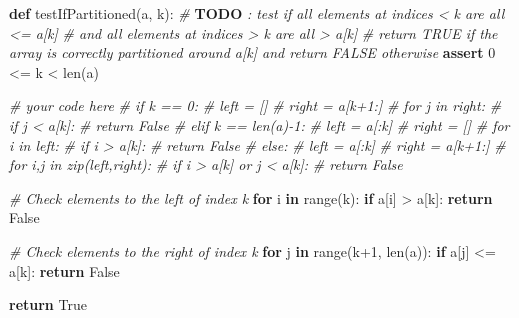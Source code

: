 \documentclass[
]{article}
\newenvironment{Shaded}{}{}
\newcommand{\AlertTok}[1]{\textcolor[rgb]{1.00,0.00,0.00}{\textbf{#1}}}
\newcommand{\BuiltInTok}[1]{\textcolor[rgb]{0.00,0.50,0.00}{#1}}
\newcommand{\CommentTok}[1]{\textcolor[rgb]{0.38,0.63,0.69}{\textit{#1}}}
\newcommand{\ControlFlowTok}[1]{\textcolor[rgb]{0.00,0.44,0.13}{\textbf{#1}}}
\newcommand{\DecValTok}[1]{\textcolor[rgb]{0.25,0.63,0.44}{#1}}
\newcommand{\KeywordTok}[1]{\textcolor[rgb]{0.00,0.44,0.13}{\textbf{#1}}}
\newcommand{\NormalTok}[1]{#1}
\newcommand{\OperatorTok}[1]{\textcolor[rgb]{0.40,0.40,0.40}{#1}}
\newcommand{\VariableTok}[1]{\textcolor[rgb]{0.10,0.09,0.49}{#1}}
\begin{document}
\begin{Shaded}
\begin{Highlighting}[]
\KeywordTok{def}\NormalTok{ testIfPartitioned(a, k):}
    \CommentTok{\# }\AlertTok{TODO}\CommentTok{ : test if all elements at indices \textless{} k are all \textless{}= a[k]}
    \CommentTok{\#         and all elements at indices \textgreater{} k are all \textgreater{} a[k]}
    \CommentTok{\# return TRUE if the array is correctly partitioned around a[k] and return FALSE otherwise}
    \ControlFlowTok{assert} \DecValTok{0} \OperatorTok{\textless{}=}\NormalTok{ k }\OperatorTok{\textless{}} \BuiltInTok{len}\NormalTok{(a)}

    \CommentTok{\# your code here}
    \CommentTok{\# if k == 0:}
    \CommentTok{\#   left = []}
    \CommentTok{\#   right = a[k+1:]}
    \CommentTok{\#   for j in right:}
    \CommentTok{\#     if j \textless{} a[k]:}
    \CommentTok{\#       return False}
    \CommentTok{\# elif k == len(a){-}1:}
    \CommentTok{\#   left = a[:k]}
    \CommentTok{\#   right = []}
    \CommentTok{\#   for i in left:}
    \CommentTok{\#     if i \textgreater{} a[k]:}
    \CommentTok{\#       return False}
    \CommentTok{\# else:}
    \CommentTok{\#   left = a[:k]}
    \CommentTok{\#   right = a[k+1:]}
    \CommentTok{\#   for i,j in zip(left,right):}
    \CommentTok{\#     if i \textgreater{} a[k] or j \textless{} a[k]:}
    \CommentTok{\#       return False}

    \CommentTok{\# Check elements to the left of index k}
    \ControlFlowTok{for}\NormalTok{ i }\KeywordTok{in} \BuiltInTok{range}\NormalTok{(k):}
        \ControlFlowTok{if}\NormalTok{ a[i] }\OperatorTok{\textgreater{}}\NormalTok{ a[k]:}
            \ControlFlowTok{return} \VariableTok{False}

    \CommentTok{\# Check elements to the right of index k}
    \ControlFlowTok{for}\NormalTok{ j }\KeywordTok{in} \BuiltInTok{range}\NormalTok{(k}\OperatorTok{+}\DecValTok{1}\NormalTok{, }\BuiltInTok{len}\NormalTok{(a)):}
        \ControlFlowTok{if}\NormalTok{ a[j] }\OperatorTok{\textless{}=}\NormalTok{ a[k]:}
            \ControlFlowTok{return} \VariableTok{False}

    \ControlFlowTok{return} \VariableTok{True}
\end{Highlighting}
\end{Shaded}
\end{document}
